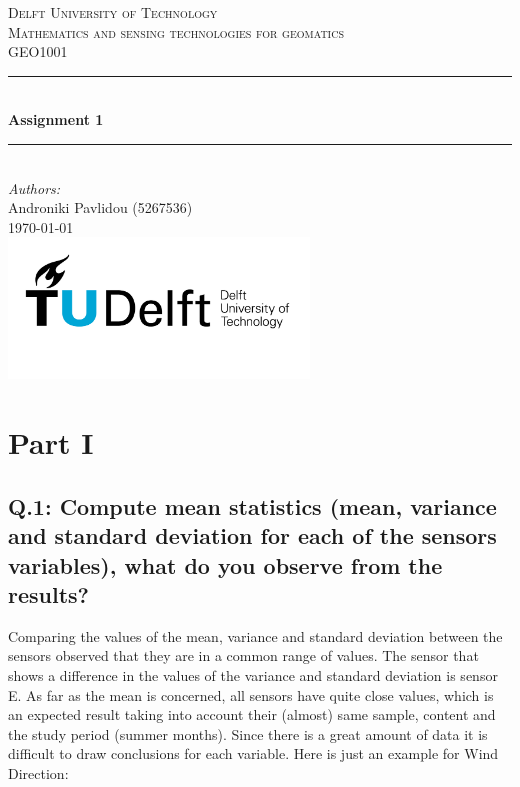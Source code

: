 \documentclass[a4paper]{article}
\begin{document}
\begin{titlepage}

\newcommand{\HRule}{\rule{\linewidth}{0.5mm}} 							%
\center 
 
\textsc{\LARGE Delft University of Technology}\\[1cm]

\textsc{\Large Mathematics and sensing technologies for geomatics }\\[0.2cm]
\textsc{\large GEO1001}\\[1cm] 										%
\HRule \\[0.8cm]
{ \huge \bfseries Assignment 1}\\[0.7cm]								%
\HRule \\[2cm]
\large
\emph{Authors:}\\
Androniki Pavlidou (5267536)\\[1.5cm]													%
{\large \today}\\[5cm]
\includegraphics[width=0.6\textwidth]{images/TU_delft_logo.jpg}\\[1cm] 	%
\vfill 
\end{titlepage}


\section{Part I}

    \subsection{Q.1: Compute mean statistics (mean, variance and standard deviation for each of the sensors variables), what do you observe from the results?}

        Comparing the values of the mean, variance and standard deviation between the sensors observed that they are in a common range of values. The sensor that shows a difference in the values of the variance and standard deviation is sensor E.  As far as the mean is concerned, all sensors have quite close values, which is an expected result taking into account their (almost) same sample, content and the study period (summer months).  
        Since there is a great amount of data it is difficult to draw conclusions for each variable.
        Here is just an example for Wind Direction:
\end{document}
